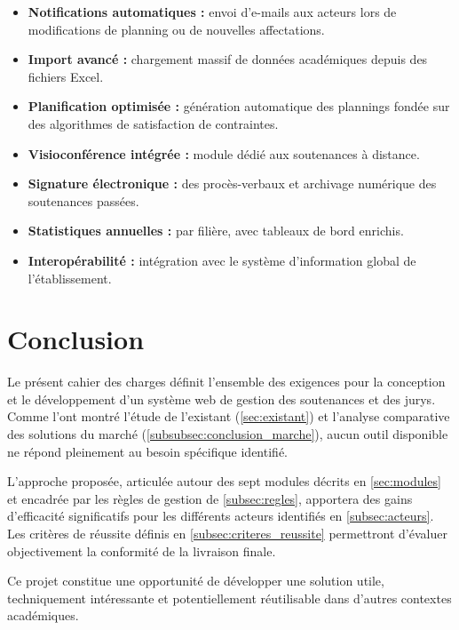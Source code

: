 \documentclass[12pt,a4paper]{article}
\begin{document}
\begin{itemize}[label=\textcolor{primary}{\textbullet}]
    \item \textbf{Notifications automatiques :} envoi d'e-mails aux acteurs lors
          de modifications de planning ou de nouvelles affectations.
    \item \textbf{Import avancé :} chargement massif de données académiques
          depuis des fichiers Excel.
    \item \textbf{Planification optimisée :} génération automatique des plannings
          fondée sur des algorithmes de satisfaction de contraintes.
    \item \textbf{Visioconférence intégrée :} module dédié aux soutenances à
          distance.
    \item \textbf{Signature électronique :} des procès-verbaux et archivage
          numérique des soutenances passées.
    \item \textbf{Statistiques annuelles :} par filière, avec tableaux de bord
          enrichis.
    \item \textbf{Interopérabilité :} intégration avec le système d'information
          global de l'établissement.
\end{itemize}

\section{Conclusion}
\label{sec:conclusion}

Le présent cahier des charges définit l'ensemble des exigences pour la
conception et le développement d'un système web de gestion des soutenances et
des jurys. Comme l'ont montré l'étude de l'existant (\ref{sec:existant}) et
l'analyse comparative des solutions du marché
(\ref{subsubsec:conclusion_marche}), aucun outil disponible ne répond
pleinement au besoin spécifique identifié.

L'approche proposée, articulée autour des sept modules décrits en
\ref{sec:modules} et encadrée par les règles de gestion de
\ref{subsec:regles}, apportera des gains d'efficacité significatifs pour les
différents acteurs identifiés en \ref{subsec:acteurs}. Les critères de réussite
définis en \ref{subsec:criteres_reussite} permettront d'évaluer objectivement
la conformité de la livraison finale.

Ce projet constitue une opportunité de développer une solution utile,
techniquement intéressante et potentiellement réutilisable dans d'autres
contextes académiques.
\end{document}
